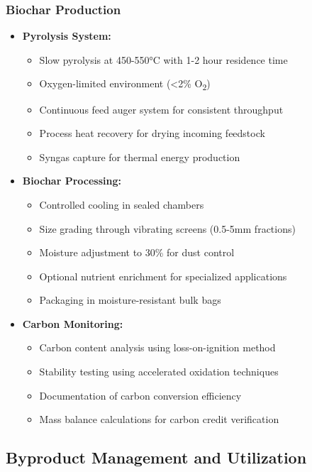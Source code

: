 \subsubsection{Biochar Production}
\begin{itemize}
    \item \textbf{Pyrolysis System:}
    \begin{itemize}
        \item Slow pyrolysis at 450-550°C with 1-2 hour residence time
        \item Oxygen-limited environment (<2\% O\textsubscript{2})
        \item Continuous feed auger system for consistent throughput
        \item Process heat recovery for drying incoming feedstock
        \item Syngas capture for thermal energy production
    \end{itemize}
    
    \item \textbf{Biochar Processing:}
    \begin{itemize}
        \item Controlled cooling in sealed chambers
        \item Size grading through vibrating screens (0.5-5mm fractions)
        \item Moisture adjustment to 30\% for dust control
        \item Optional nutrient enrichment for specialized applications
        \item Packaging in moisture-resistant bulk bags
    \end{itemize}
    
    \item \textbf{Carbon Monitoring:}
    \begin{itemize}
        \item Carbon content analysis using loss-on-ignition method
        \item Stability testing using accelerated oxidation techniques
        \item Documentation of carbon conversion efficiency
        \item Mass balance calculations for carbon credit verification
    \end{itemize}
\end{itemize}

\subsection{Byproduct Management and Utilization}
\label{sec:byproduct_management}

